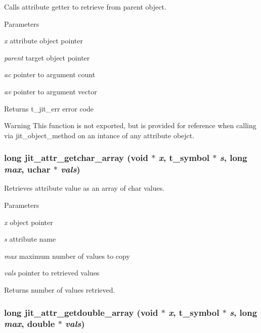 Calls attribute getter to retrieve from parent object. 
\begin{DoxyParams}{Parameters}
\item[{\em x}]attribute object pointer \item[{\em parent}]target object pointer \item[{\em ac}]pointer to argument count \item[{\em av}]pointer to argument vector\end{DoxyParams}
\begin{DoxyReturn}{Returns}
t\_\-jit\_\-err error code
\end{DoxyReturn}
\begin{DoxyWarning}{Warning}
This function is not exported, but is provided for reference when calling via jit\_\-object\_\-method on an intance of any attribute obejct. 
\end{DoxyWarning}
\hypertarget{group__attrmod_ga7f7021b95c16231de0a57489c40bd2e5}{
\subsubsection[{jit\_\-attr\_\-getchar\_\-array}]{\setlength{\rightskip}{0pt plus 5cm}long jit\_\-attr\_\-getchar\_\-array (void $\ast$ {\em x}, \/  {\bf t\_\-symbol} $\ast$ {\em s}, \/  long {\em max}, \/  {\bf uchar} $\ast$ {\em vals})}}
\label{group__attrmod_ga7f7021b95c16231de0a57489c40bd2e5}


Retrieves attribute value as an array of char values. 
\begin{DoxyParams}{Parameters}
\item[{\em x}]object pointer \item[{\em s}]attribute name \item[{\em max}]maximum number of values to copy \item[{\em vals}]pointer to retrieved values\end{DoxyParams}
\begin{DoxyReturn}{Returns}
number of values retrieved. 
\end{DoxyReturn}
\hypertarget{group__attrmod_gac4994752c34ea46af06022e77e0ec229}{
\subsubsection[{jit\_\-attr\_\-getdouble\_\-array}]{\setlength{\rightskip}{0pt plus 5cm}long jit\_\-attr\_\-getdouble\_\-array (void $\ast$ {\em x}, \/  {\bf t\_\-symbol} $\ast$ {\em s}, \/  long {\em max}, \/  double $\ast$ {\em vals})}}
\label{group__attrmod_gac4994752c34ea46af06022e77e0ec229}


